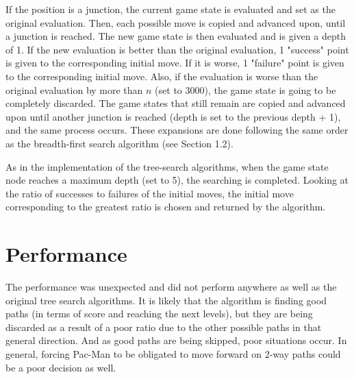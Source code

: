 \documentclass[a4paper,oneside,10pt]{report}
\begin{document}
If the position is a junction, the current game state is evaluated and set as the original evaluation. Then, each possible move is copied and advanced upon, until a junction is reached. The new game state is then evaluated and is given a depth of 1. If the new evaluation is better than the original evaluation, 1 "success" point is given to the corresponding initial move. If it is worse, 1 "failure" point is given to the corresponding initial move. Also, if the evaluation is worse than the original evaluation by more than $n$ (set to 3000), the game state is going to be completely discarded. The game states that still remain are copied and advanced upon until another junction is reached (depth is set to the previous depth + 1), and the same process occurs. These expansions are done following the same order as the breadth-first search algorithm (see Section 1.2). 

As in the implementation of the tree-search algorithms, when the game state node reaches a maximum depth (set to 5), the searching is completed. Looking at the ratio of successes to failures of the initial moves, the initial move corresponding to the greatest ratio is chosen and returned by the algorithm.

\section {Performance} \label{custPerf}

The performance was unexpected and did not perform anywhere as well as the original tree search algorithms. It is likely that the algorithm is finding good paths (in terms of score and reaching the next levels), but they are being discarded as a result of a poor ratio due to the other possible paths in that general direction. And as good paths are being skipped, poor situations occur. In general, forcing Pac-Man to be obligated to move forward on 2-way paths could be a poor decision as well.
\end{document}
